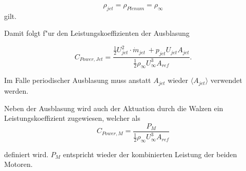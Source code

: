 	\begin{equation}
	\label{eq:Inkompressibilitaet}
		\rho_{jet} = \rho_{Plenum} = \rho_{\infty}
	\end{equation}
gilt.

Damit folgt f"ur den Leistungskoeffizienten der Ausblasung

	\begin{equation}
	\label{eq:CPowerJ vereinfacht}
		C_{Power,Jet} = \frac{\frac{1}{2}U^2_{jet} \cdot \dot{m}_{jet} \, + p_{jet}U_{jet}A_{jet}}{\frac{1}{2}\rho_{\infty}U^3_{\infty}A_{ref}}.
	\end{equation}

Im Falle periodischer Ausblasung muss anstatt $A_{jet}$ wieder $\langle{A_{jet}}\rangle$ verwendet werden.

Neben der Ausblasung wird auch der Aktuation durch die Walzen ein Leistungskoeffizient zugewiesen, welcher als
		\begin{equation}
		\label{eq:def-CPowerM}
			C_{Power,M} = \frac{P_M}{\frac{1}{2}\rho_{\infty}U^3_{\infty}A_{ref}}
		\end{equation}
		
definiert wird.
$P_M$ entspricht wieder der kombinierten Leistung der beiden Motoren.